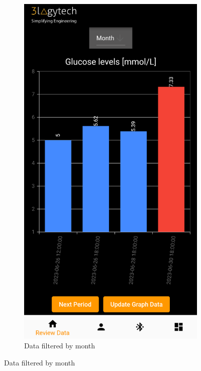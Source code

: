 \documentclass[a4paper]{scrreprt}
\begin{document}
\begin{figure}[h]
\ContinuedFloat
    \begin{subfigure}{0.45\textwidth}
        \centering
        \includegraphics[scale=0.47]{graph_month.png}
        \caption{Data filtered by month}
        \label{fig:graph5}
    \end{subfigure}

\end{figure}
\end{document}

